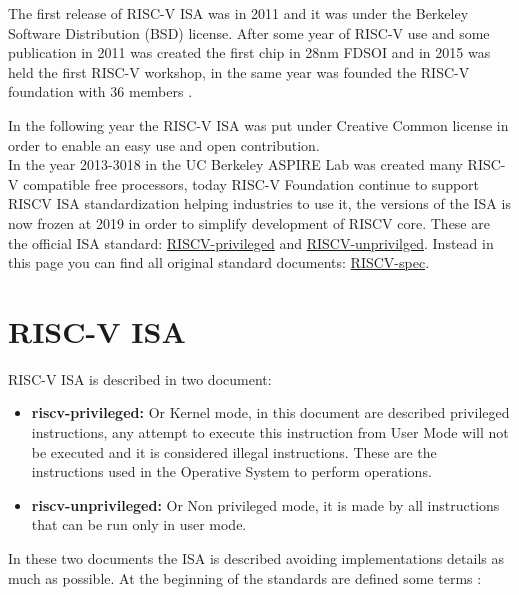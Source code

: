{{	    The first release of RISC-V ISA was in 2011 and it was under the Berkeley Software Distribution (BSD) license. 
	    After some year of RISC-V use and some publication  in 2011 was created the first chip in 28nm FDSOI and in 2015 was held the first RISC-V workshop, in the same year was founded the RISC-V foundation with 36 members .
	    
	    In the following year the RISC-V ISA was put under Creative Common license in order to enable an easy use and open contribution.\\
	    
	    In the year 2013-3018 in the UC Berkeley ASPIRE Lab was created many RISC-V compatible free processors, today RISC-V Foundation continue to support RISCV ISA standardization helping industries to use it, the versions of the ISA is now frozen at 2019  in order to simplify development of RISCV core. 
	    These are the official ISA  standard: \href{https://github.com/riscv/riscv-isa-manual/releases/download/Ratified-IMFDQC-and-Priv-v1.11/riscv-privileged-20190608.pdf}{RISCV-privileged} and  \href{https://github.com/riscv/riscv-isa-manual/releases/download/Ratified-IMAFDQC/riscv-spec-20191213.pdf}{RISCV-unprivilged}. 
	    Instead in this page you can find all original standard documents: \href{https://riscv.org/technical/specifications/}{RISCV-spec}.
	}%

	\section{RISC-V ISA}{
	    RISC-V ISA is described in two document:
	    \begin{itemize}
	        \item \textbf{riscv-privileged:} Or Kernel mode, in this document are described privileged  instructions, any attempt to execute this instruction from User Mode will not be executed and it is considered illegal instructions. These are the instructions used in the Operative System to perform operations.
	        \item \textbf{riscv-unprivileged:} Or Non privileged mode, it is made by all instructions that can be run only in user mode.
	    \end{itemize}
	    
	    In these two documents the ISA is described avoiding implementations details as much as possible. At the beginning of the standards are defined some terms :
	    
}}
